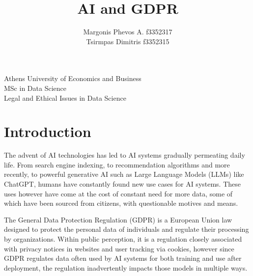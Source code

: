 \documentclass{article}
\title{\Huge AI and GDPR}
\author{\large Margonis Phevos A.\hspace{10pt} f3352317 \\\large Tsirmpas Dimitris\hspace{10pt} f3352315}
\begin{document}
	\begin{titlepage}
		\maketitle
        \thispagestyle{empty} %

		\begin{center}
			
			\LARGE Athens University of Economics and Business\\
			\Large MSc in Data Science\\
            \large Legal and Ethical Issues in Data Science\\
			
		\end{center}
		
	\end{titlepage}

\maketitle

\thispagestyle{empty}
\tableofcontents

\newpage
{} %
	
\section{Introduction}

The advent of AI technologies has led to AI systems gradually permeating daily life. From search engine indexing, to recommendation algorithms and more recently, to powerful generative AI such as Large Language Models (LLMs) like ChatGPT, humans have constantly found new use cases for AI systems. These uses however have come at the cost of constant need for more data, some of which have been sourced from citizens, with questionable motives and means.

The General Data Protection Regulation (GDPR) is a European Union law designed to protect the personal data of individuals and regulate their processing by organizations. Within public perception, it is a regulation closely associated with privacy notices in websites and user tracking via cookies, however since GDPR regulates data often used by AI systems for both training and use after deployment, the regulation inadvertently impacts those models in multiple ways.
\end{document}
